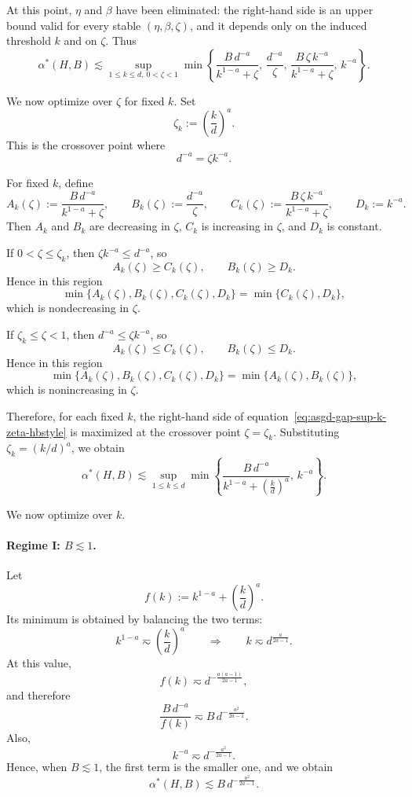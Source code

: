 \documentclass{article}
\def\eqref#1{equation~\ref{#1}}
\begin{document}
At this point, \(\eta\) and \(\beta\) have been eliminated: the right-hand side
is an upper bound valid for every stable \((\eta,\beta,\zeta)\), and it depends
only on the induced threshold \(k\) and on \(\zeta\). Thus
\begin{equation}
\label{eq:asgd-gap-sup-k-zeta-hbstyle}
\alpha^*(H,B)
\lesssim
\sup_{1\le k\le d,\ 0<\zeta<1}
\min\left\{
\frac{B\,d^{-a}}{k^{1-a}+\zeta},
\,
\frac{d^{-a}}{\zeta},
\,
\frac{B\,\zeta\,k^{-a}}{k^{1-a}+\zeta},
\,
k^{-a}
\right\}.
\end{equation}

We now optimize over \(\zeta\) for fixed \(k\). Set
\[
\zeta_k:=\left(\frac{k}{d}\right)^a.
\]
This is the crossover point where
\[
d^{-a}=\zeta k^{-a}.
\]

For fixed \(k\), define
\[
A_k(\zeta):=\frac{B\,d^{-a}}{k^{1-a}+\zeta},
\qquad
B_k(\zeta):=\frac{d^{-a}}{\zeta},
\qquad
C_k(\zeta):=\frac{B\,\zeta\,k^{-a}}{k^{1-a}+\zeta},
\qquad
D_k:=k^{-a}.
\]
Then \(A_k\) and \(B_k\) are decreasing in \(\zeta\), \(C_k\) is increasing in
\(\zeta\), and \(D_k\) is constant.

If \(0<\zeta\le \zeta_k\), then \(\zeta k^{-a}\le d^{-a}\), so
\[
A_k(\zeta)\ge C_k(\zeta),
\qquad
B_k(\zeta)\ge D_k.
\]
Hence in this region
\[
\min\{A_k(\zeta),B_k(\zeta),C_k(\zeta),D_k\}
=
\min\{C_k(\zeta),D_k\},
\]
which is nondecreasing in \(\zeta\).

If \(\zeta_k\le \zeta<1\), then \(d^{-a}\le \zeta k^{-a}\), so
\[
A_k(\zeta)\le C_k(\zeta),
\qquad
B_k(\zeta)\le D_k.
\]
Hence in this region
\[
\min\{A_k(\zeta),B_k(\zeta),C_k(\zeta),D_k\}
=
\min\{A_k(\zeta),B_k(\zeta)\},
\]
which is nonincreasing in \(\zeta\).

Therefore, for each fixed \(k\), the right-hand side of
\eqref{eq:asgd-gap-sup-k-zeta-hbstyle} is maximized at the crossover point
\(\zeta=\zeta_k\). Substituting \(\zeta_k=(k/d)^a\), we obtain
\begin{equation}
\label{eq:asgd-gap-sup-k-only-hbstyle}
\alpha^*(H,B)
\lesssim
\sup_{1\le k\le d}
\min\left\{
\frac{B\,d^{-a}}{k^{1-a}+\left(\frac{k}{d}\right)^a},
\,
k^{-a}
\right\}.
\end{equation}

We now optimize over \(k\).

\paragraph{Regime I: \(B\lesssim 1\).}
Let
\[
f(k):=k^{1-a}+\left(\frac{k}{d}\right)^a.
\]
Its minimum is obtained by balancing the two terms:
\[
k^{1-a}\eqsim \left(\frac{k}{d}\right)^a
\qquad\Longrightarrow\qquad
k\eqsim d^{\frac{a}{2a-1}}.
\]
At this value,
\[
f(k)\eqsim d^{-\frac{a(a-1)}{2a-1}},
\]
and therefore
\[
\frac{B\,d^{-a}}{f(k)}
\eqsim
B\,d^{-\frac{a^2}{2a-1}}.
\]
Also,
\[
k^{-a}\eqsim d^{-\frac{a^2}{2a-1}}.
\]
Hence, when \(B\lesssim 1\), the first term is the smaller one, and we obtain
\[
\alpha^*(H,B)
\lesssim
B\,d^{-\frac{a^2}{2a-1}}.
\]
\end{document}

